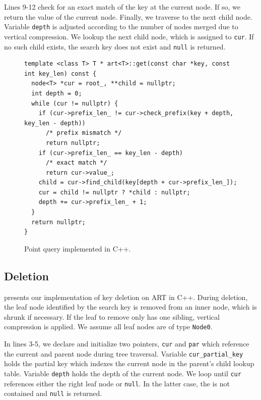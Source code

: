 \documentclass[abstracton,12pt]{scrartcl}
\theoremstyle{definition}
\begin{document}
Lines 9-12 check for an exact match of the key at the current node. If so,
we return the value of the current node. Finally, we traverse to the next child
node. Variable \texttt{depth} is adjusted according to the number of nodes 
merged due to vertical compression. We lookup the next child node, which is 
assigned to \texttt{cur}. If no such child exists, the search key does not 
exist and \texttt{null} is returned.

\vspace{-2mm}

\begin{figure}[H]
  \begin{verbatim}
template <class T> T * art<T>::get(const char *key, const int key_len) const {
  node<T> *cur = root_, **child = nullptr;
  int depth = 0;
  while (cur != nullptr) {
    if (cur->prefix_len_ != cur->check_prefix(key + depth, key_len - depth))
      /* prefix mismatch */
      return nullptr;
    if (cur->prefix_len_ == key_len - depth)
      /* exact match */
      return cur->value_;
    child = cur->find_child(key[depth + cur->prefix_len_]);
    cur = child != nullptr ? *child : nullptr;
    depth += cur->prefix_len_ + 1;
  }
  return nullptr;
}
  \end{verbatim}
  \vspace{-6mm}
  \caption{Point query implemented in C++.}
  \label{algo:point-query}
  \vspace{-7mm}
\end{figure}

\newpage

\subsection{Deletion}\label{sec:deletion}

 presents our implementation of key deletion on ART in C++.
During deletion, the leaf node identified by the search key is removed from an
inner node, which is shrunk if necessary. 
If the leaf to remove only has one sibling, vertical
compression is applied. We assume all leaf nodes are of type \texttt{Node0}.

In lines 3-5, we declare and initialize two pointers, \texttt{cur} and
\texttt{par} which reference the current and parent node during tree traversal.
Variable \texttt{cur\_partial\_key} holds the partial key which indexes the
current node in the parent's child lookup table.
Variable \texttt{depth} holds the depth of the current node.
We loop until \texttt{cur} references either the right leaf node or
\texttt{null}. In the latter case, the is not contained and \texttt{null} is 
returned.
\end{document}
